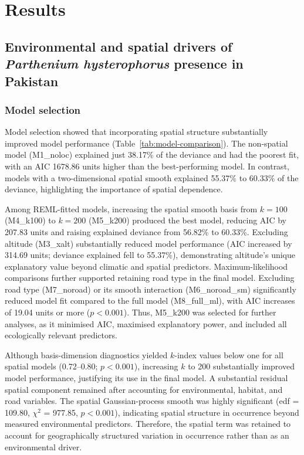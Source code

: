 \chapter{Results}

\section{Environmental and spatial drivers of \textit{Parthenium hysterophorus} presence in Pakistan}

\subsection{Model selection}

Model selection showed that incorporating spatial structure substantially improved model performance (Table~\ref{tab:model-comparison}). The non-spatial model (M1\_noloc) explained just 38.17\% of the deviance and had the poorest fit, with an AIC 1678.86 units higher than the best-performing model. In contrast, models with a two-dimensional spatial smooth explained 55.37\% to 60.33\% of the deviance, highlighting the importance of spatial dependence.

Among REML-fitted models, increasing the spatial smooth basis from $k = 100$ (M4\_k100) to $k = 200$ (M5\_k200) produced the best model, reducing AIC by 207.83 units and raising explained deviance from 56.82\% to 60.33\%. Excluding altitude (M3\_xalt) substantially reduced model performance (AIC increased by 314.69 units; deviance explained fell to 55.37\%), demonstrating altitude's unique explanatory value beyond climatic and spatial predictors. Maximum-likelihood comparisons further supported retaining road type in the final model. Excluding road type (M7\_noroad) or its smooth interaction (M6\_noroad\_sm) significantly reduced model fit compared to the full model (M8\_full\_ml), with AIC increases of 19.04 units or more ($p < 0.001$). Thus, M5\_k200 was selected for further analyses, as it minimised AIC, maximised explanatory power, and included all ecologically relevant predictors.

Although basis-dimension diagnostics yielded $k$-index values below one for all spatial models (0.72--0.80; $p < 0.001$), increasing $k$ to 200 substantially improved model performance, justifying its use in the final model. A substantial residual spatial component remained after accounting for environmental, habitat, and road variables. The spatial Gaussian-process smooth was highly significant (edf = 109.80, $\chi^2$ = 977.85, $p < 0.001$), indicating spatial structure in occurrence beyond measured environmental predictors. Therefore, the spatial term was retained to account for geographically structured variation in occurrence rather than as an environmental driver.

